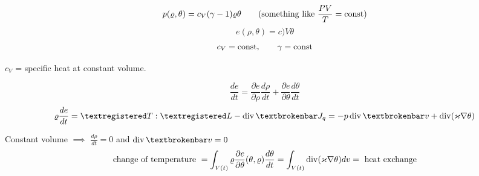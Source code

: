 \documentclass[12pt]{article}					%
\begin{document}
\begin{poznamka}
	$$ p(\varrho, \theta) = c_V(\gamma - 1)\varrho\theta \qquad (\text{something like } \frac{PV}{T} = \operatorname{const}) $$
	$$ e(\rho, \theta) = c)V \theta $$
	$$ c_V = \operatorname{const}, \qquad \gamma = \operatorname{const} $$

	$c_V$ = specific heat at constant volume.

	\begin{poznamkain}[$c_V$]
		$$ \frac{de}{dt} = \frac{\partial e}{\partial \rho} \frac{d\rho}{dt} + \frac{\partial e}{\partial \theta} \frac{d\theta}{dt} $$
		$$ \rho \frac{de}{dt} = ®T:®L - \Div ¦J_q = -p \Div ¦v + \Div(\kappa \nabla \theta) $$

		Constant volume $\implies$ $\frac{d\rho}{dt} = 0$ and $\Div ¦v = 0$
		$$ \text{change of temperature } = \int_{V(t)} \varrho \frac{\partial e}{\partial \theta}(\theta, \varrho) \frac{d\theta}{dt} = \int_{V(t)} \operatorname{div}(\varkappa \nabla \theta) dv = \text{ heat exchange} $$
	\end{poznamkain}
\end{poznamka}
\end{document}
